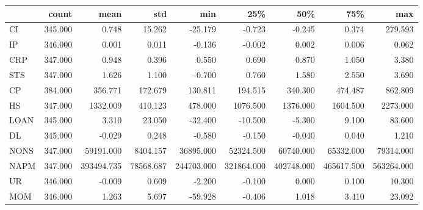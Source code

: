 \begin{tabular}{lrrrrrrrr}
\toprule
{} &   count &       mean &       std &        min &        25\% &        50\% &        75\% &        max \\
\midrule
CI   & 345.000 &      0.748 &    15.262 &    -25.179 &     -0.723 &     -0.245 &      0.374 &    279.593 \\
IP   & 346.000 &      0.001 &     0.011 &     -0.136 &     -0.002 &      0.002 &      0.006 &      0.062 \\
CRP  & 347.000 &      0.948 &     0.396 &      0.550 &      0.690 &      0.870 &      1.050 &      3.380 \\
STS  & 347.000 &      1.626 &     1.100 &     -0.700 &      0.760 &      1.580 &      2.550 &      3.690 \\
CP   & 384.000 &    356.771 &   172.679 &    130.811 &    194.515 &    340.300 &    474.487 &    862.809 \\
HS   & 347.000 &   1332.009 &   410.123 &    478.000 &   1076.500 &   1376.000 &   1604.500 &   2273.000 \\
LOAN & 345.000 &      3.310 &    23.050 &    -32.400 &    -10.500 &     -5.300 &      9.100 &     83.600 \\
DL   & 345.000 &     -0.029 &     0.248 &     -0.580 &     -0.150 &     -0.040 &      0.040 &      1.210 \\
NONS & 347.000 &  59191.000 &  8404.157 &  36895.000 &  52324.500 &  60740.000 &  65332.000 &  79314.000 \\
NAPM & 347.000 & 393494.735 & 78568.687 & 244703.000 & 321864.000 & 402748.000 & 465617.500 & 563264.000 \\
UR   & 346.000 &     -0.009 &     0.609 &     -2.200 &     -0.100 &      0.000 &      0.100 &     10.300 \\
MOM  & 346.000 &      1.263 &     5.697 &    -59.928 &     -0.406 &      1.018 &      3.410 &     23.092 \\
\bottomrule
\end{tabular}
